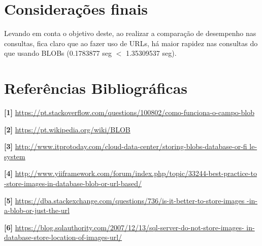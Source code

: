 \documentclass[12pt,a4paper]{article}
\begin{document}






\section{Considerações finais}
Levando em conta o objetivo deste, ao realizar a comparação de desempenho nas consultas, fica claro que ao fazer uso de URLs, há maior rapidez nas consultas do que usando BLOBs (0.1783877 seg $<$ 1.35309537 seg).



\section{Referências Bibliográficas}
\noindent \textbf{[1]} \url {https://pt.stackoverflow.com/questions/100802/como-funciona-o-campo-blob}\\\vspace{0.2cm}

\noindent \textbf{[2] }\url{https://pt.wikipedia.org/wiki/BLOB}\\\vspace{0.2cm}

\noindent \textbf{[3] }\url{http://www.itprotoday.com/cloud-data-center/storing-blobs-database-or-fi
le-system}\\\vspace{0.2cm}

\noindent \textbf{[4] }\url{http://www.yiiframework.com/forum/index.php/topic/33244-best-practice-to
-store-images-in-database-blob-or-url-based/}\\\vspace{0.2cm}

\noindent \textbf{[5] }\url{https://dba.stackexchange.com/questions/736/is-it-better-to-store-images
-in-a-blob-or-just-the-url}\\\vspace{0.2cm}

\noindent \textbf{[6] }\url{https://blog.sqlauthority.com/2007/12/13/sql-server-do-not-store-images-
in-database-store-location-of-images-url/}\\\vspace{0.2cm}
\end{document}
